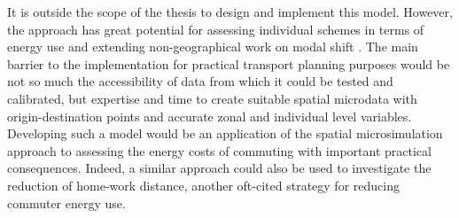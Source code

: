 \documentclass[a4paper, 11pt, twoside]{Thesis}
\begin{document}
It is outside the scope of the thesis to design and
implement this model. However, the approach has great potential for
assessing individual schemes in terms of energy use and extending
non-geographical work on modal shift \citep{Lovelace2011-assessing}. The main barrier
to the implementation for practical transport planning purposes
would be not so much the accessibility of data from which it could be tested
and calibrated, but expertise and time to create suitable spatial microdata
with origin-destination points and accurate zonal and individual level
variables. Developing such a model would be an application of the spatial
microsimulation approach to assessing the energy costs of commuting with
important practical consequences. Indeed, a similar approach could also be used
to investigate the reduction of home-work distance, another oft-cited strategy
for reducing commuter energy use.
\end{document}
